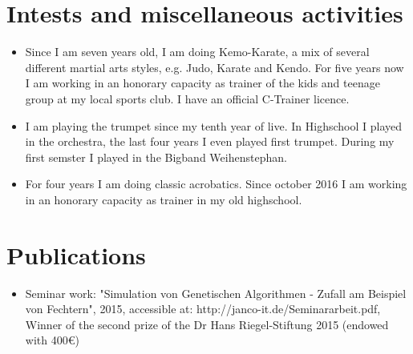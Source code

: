 \documentclass[11pt,a4paper,sans]{moderncv}        %
\begin{document}
\section{Intests and miscellaneous activities}

\vspace{6pt}

\begin{itemize}

\item{Since I am seven years old, I am doing Kemo-Karate, a mix of several different martial arts styles, e.g. Judo, Karate and Kendo. For five years now I am working in an honorary capacity as trainer of the kids and teenage group at my local sports club. I have an official C-Trainer licence.}

\vspace{6pt}

\item{I am playing the trumpet since my tenth year of live. In Highschool I played in the orchestra, the last four years I even played first trumpet. During my first semster I played in the Bigband Weihenstephan.}

\vspace{6pt}

\item{For four years I am doing classic acrobatics. Since october 2016 I am working in an honorary capacity as trainer in my old highschool.}

\end{itemize}

\section{Publications}

\vspace{6pt}

\begin{itemize}

\item{Seminar work: "Simulation von Genetischen Algorithmen - Zufall am Beispiel von Fechtern", 2015, accessible at: http://janco-it.de/Seminararbeit.pdf, Winner of the second prize of the Dr Hans Riegel-Stiftung 2015 (endowed with 400\euro)}

\end{itemize}



\end{document}
